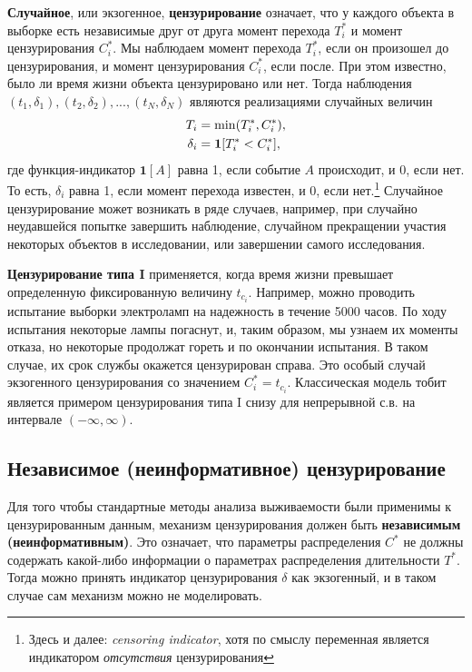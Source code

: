 \textbf{Случайное}, или экзогенное, \textbf{цензурирование} означает, что у каждого объекта в выборке есть независимые друг от друга момент перехода $T^*_i$ и момент цензурирования $C^*_i$. Мы наблюдаем момент перехода $T^*_i$, если он произошел до цензурирования, и момент цензурирования $C^*_i$, если после. При этом известно, было ли время жизни объекта цензурировано или нет. Тогда наблюдения $(t_1,\delta_1), (t_2,\delta_2), ..., (t_N,\delta_N)$ являются реализациями случайных величин
        \begin{align}
        \label{eq:17.10}
        T_i&=\min(T^*_i, C^*_i),\\
        \delta_i&=\mathbf{1}[T^*_i<C^*_i], \notag
        \end{align}
где функция-индикатор $\mathbf{1}[A]$ равна 1, если событие $A$ происходит, и 0, если нет. То есть, $\delta_i$ равна 1, если момент перехода известен, и 0, если нет.\footnote{Здесь и далее: \textit{censoring indicator}, хотя по смыслу переменная является индикатором \textit{отсутствия} цензурирования}
Случайное цензурирование может возникать в ряде случаев, например, при случайно неудавшейся попытке завершить наблюдение, случайном прекращении участия некоторых объектов в исследовании, или завершении самого исследования. %

\textbf{Цензурирование типа I} применяется, когда время жизни превышает определенную фиксированную величину $t_{c_i}$. Например, можно проводить испытание выборки электроламп на надежность в течение 5000 часов. По ходу испытания некоторые лампы погаснут, и, таким образом, мы узнаем их моменты отказа, но некоторые продолжат гореть и по окончании испытания. В таком случае, их срок службы окажется цензурирован справа. Это особый случай экзогенного цензурирования со значением $C^*_i=t_{c_i}$. Классическая модель тобит является примером цензурирования типа I снизу для непрерывной с.в. на интервале $(-\infty,\infty)$.


\subsection{Независимое (неинформативное) цензурирование}\label{sec:17.4.2}

\noindent
Для того чтобы стандартные методы анализа выживаемости были применимы к цензурированным данным, механизм цензурирования должен быть \textbf{независимым (неинформативным)}. Это означает, что параметры распределения $C^*$ не должны содержать какой-либо информации о параметрах распределения длительности $T^*$. Тогда можно принять индикатор цензурирования $\delta$ как экзогенный, и в таком случае сам механизм можно не моделировать.

